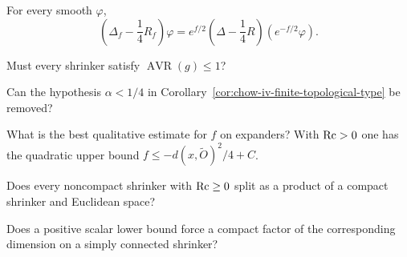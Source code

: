 \begin{claim}
\label{ex:chow-iv-weighted-conjugation}
For every smooth $\varphi$,
\[
\left(\Delta_f-\frac14R_f\right)\varphi
=e^{f/2}\left(\Delta-\frac14R\right)(e^{-f/2}\varphi).
\]
\end{claim}

\begin{claim}
\label{prob:chow-iv-avr-one}
Must every shrinker satisfy $\operatorname{AVR}(g)\le1$?
\end{claim}

\begin{claim}
\label{prob:chow-iv-critical-growth}
Can the hypothesis $\alpha<1/4$ in Corollary~\ref{cor:chow-iv-finite-topological-type}
be removed?
\end{claim}

\begin{claim}
\label{prob:chow-iv-expander-potential}
What is the best qualitative estimate for $f$ on expanders?  With $\operatorname{Rc}>0$ one
has the quadratic upper bound $f\le-d(x,\widetilde O)^2/4+C$.
\end{claim}

\begin{claim}
\label{prob:chow-iv-shrinker-splitting}
Does every noncompact shrinker with $\operatorname{Rc}\ge0$ split as a product of a compact
shrinker and Euclidean space?
\end{claim}

\begin{claim}
\label{ques:chow-iv-compact-factor}
Does a positive scalar lower bound force a compact factor of the corresponding
dimension on a simply connected shrinker?
\end{claim}


